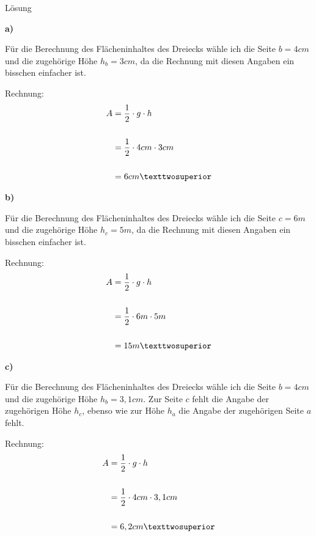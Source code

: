 \documentclass[
  ngerman,
]{book}
\begin{document}
Lösung

\textbf{a)}

Für die Berechnung des Flächeninhaltes des Dreiecks wähle ich die Seite \(b=4cm\) und die zugehörige Höhe \(h_b = 3cm\), da die Rechnung mit diesen Angaben ein bisschen einfacher ist.

Rechnung: \[ \begin{align} A &= {1 \over 2} \cdot g \cdot h \\
                            {}\\
                             & = {1 \over 2} \cdot 4 cm \cdot 3cm  \\
                             {}\\
                             & = 6 cm² \end{align}\]

\textbf{b)}

Für die Berechnung des Flächeninhaltes des Dreiecks wähle ich die Seite \(c=6m\) und die zugehörige Höhe \(h_c = 5m\), da die Rechnung mit diesen Angaben ein bisschen einfacher ist.

Rechnung: \[ \begin{align} A &= {1 \over 2} \cdot g \cdot h \\
                              {}\\
                              & = {1 \over 2} \cdot 6m \cdot 5m \\ 
                              {}\\
                              & = 15m² \end{align}\]

\textbf{c)}

Für die Berechnung des Flächeninhaltes des Dreiecks wähle ich die Seite \(b=4cm\) und die zugehörige Höhe \(h_b = 3,1 cm\). Zur Seite \(c\) fehlt die Angabe der zugehörigen Höhe \(h_c\), ebenso wie zur Höhe \(h_a\) die Angabe der zugehörigen Seite \(a\) fehlt.

Rechnung: \[ \begin{align} A & = {1 \over 2} \cdot g \cdot h \\
                              {}\\
                              & = {1 \over 2} \cdot 4cm \cdot 3,1cm \\
                              {}\\
                              & = 6,2 cm²\end{align} \]

\hypertarget{section-6}{%
\subsubsection*{}\label{section-6}}
\end{document}
